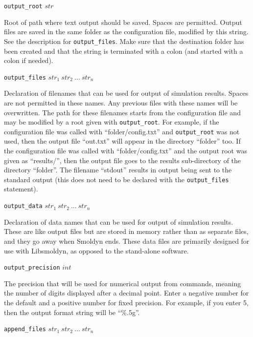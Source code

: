 \documentclass {scrbook}
\newcommand {\ttt} {\texttt}
\begin{document}
\begin{description}

\item{\ttt{output\_root} $str$}

Root of path where text output should be saved. Spaces are permitted. Output files are saved in the same folder as the configuration file, modified by this string. See the description for \ttt{output\_files}. Make sure that the destination folder has been created and that the string is terminated with a colon (and started with a colon if needed).

\item{\ttt{output\_files} $str_1\ str_2\ ...\ str_n$}

Declaration of filenames that can be used for output of simulation results. Spaces are not permitted in these names. Any previous files with these names will be overwritten. The path for these filenames starts from the configuration file and may be modified by a root given with \ttt{output\_root}. For example, if the configuration file was called with ``folder/config.txt'' and \ttt{output\_root} was not used, then the output file ``out.txt'' will appear in the directory ``folder'' too. If the configuration file was called with ``folder/config.txt'' and the output root was given as ``results/'', then the output file goes to the results sub-directory of the directory ``folder''. The filename ``stdout'' results in output being sent to the standard output (this does not need to be declared with the \ttt{output\_files} statement).

\item{\ttt{output\_data} $str_1\ str_2\ ...\ str_n$}

Declaration of data names that can be used for output of simulation results. These are like output files but are stored in memory rather than as separate files, and they go away when Smoldyn ends. These data files are primarily designed for use with Libsmoldyn, as opposed to the stand-alone software.

\item{\ttt{output\_precision} $int$}

The precision that will be used for numerical output from commands, meaning the number of digits displayed after a decimal point. Enter a negative number for the default and a positive number for fixed precision. For example, if you enter 5, then the output format string will be ``\%.5g''.

\item{\ttt{append\_files} $str_1\ str_2\ ...\ str_n$}


\end{description}
\end{document}
